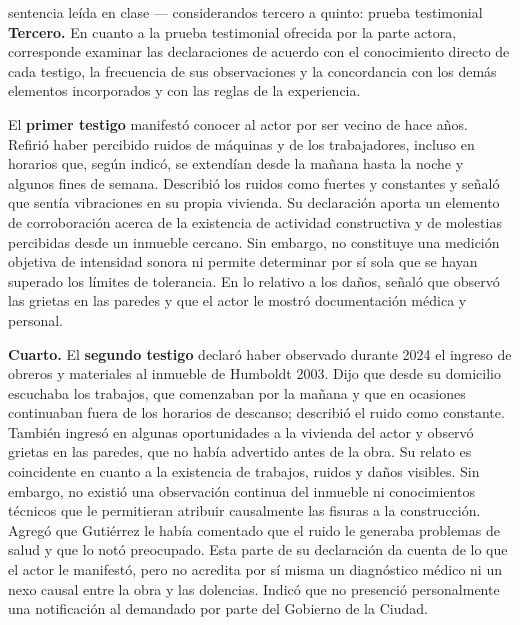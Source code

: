\documentclass[12pt,oneside]{book}
\begin{document}
\begin{example}{sentencia le\'ida en clase --- considerandos tercero a quinto: prueba testimonial}
\textbf{Tercero.} En cuanto a la prueba testimonial ofrecida por la parte actora, corresponde examinar las declaraciones de acuerdo con el conocimiento directo de cada testigo, la frecuencia de sus observaciones y la concordancia con los dem\'as elementos incorporados y con las reglas de la experiencia.

El \textbf{primer testigo} manifest\'o conocer al actor por ser vecino de hace a\~nos. Refiri\'o haber percibido ruidos de m\'aquinas y de los trabajadores, incluso en horarios que, seg\'un indic\'o, se extend\'ian desde la ma\~nana hasta la noche y algunos fines de semana. Describi\'o los ruidos como fuertes y constantes y se\~nal\'o que sent\'ia vibraciones en su propia vivienda. Su declaraci\'on aporta un elemento de corroboraci\'on acerca de la existencia de actividad constructiva y de molestias percibidas desde un inmueble cercano. Sin embargo, no constituye una medici\'on objetiva de intensidad sonora ni permite determinar por s\'i sola que se hayan superado los l\'imites de tolerancia. En lo relativo a los da\~nos, se\~nal\'o que observ\'o las grietas en las paredes y que el actor le mostr\'o documentaci\'on m\'edica y personal.

\textbf{Cuarto.} El \textbf{segundo testigo} declar\'o haber observado durante 2024 el ingreso de obreros y materiales al inmueble de Humboldt 2003. Dijo que desde su domicilio escuchaba los trabajos, que comenzaban por la ma\~nana y que en ocasiones continuaban fuera de los horarios de descanso; describi\'o el ruido como constante. Tambi\'en ingres\'o en algunas oportunidades a la vivienda del actor y observ\'o grietas en las paredes, que no hab\'ia advertido antes de la obra. Su relato es coincidente en cuanto a la existencia de trabajos, ruidos y da\~nos visibles. Sin embargo, no existi\'o una observaci\'on continua del inmueble ni conocimientos t\'ecnicos que le permitieran atribuir causalmente las fisuras a la construcci\'on. Agreg\'o que Guti\'errez le hab\'ia comentado que el ruido le generaba problemas de salud y que lo not\'o preocupado. Esta parte de su declaraci\'on da cuenta de lo que el actor le manifest\'o, pero no acredita por s\'i misma un diagn\'ostico m\'edico ni un nexo causal entre la obra y las dolencias. Indic\'o que no presenci\'o personalmente una notificaci\'on al demandado por parte del Gobierno de la Ciudad.


\end{example}
\end{document}
